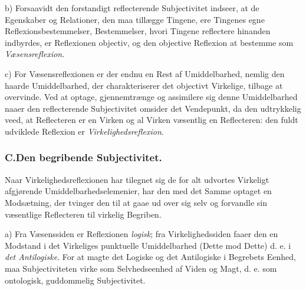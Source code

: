 \documentclass[11pt]{book}
\begin{document}
b) Forsaavidt den forstandigt reflecterende Subjectivitet indseer, at de
Egenskaber og Relationer, den maa tillægge Tingene, ere Tingenes egne
Reflexionsbestemmelser, Bestemmelser, hvori Tingene reflectere hinanden
indbyrdes, er Reflexionen objectiv, og den objective Reflexion at
bestemme som \emph{Væsensreflexion}.

c) For Væsensreflexionen er der endnu en Rest af Umiddelbarhed, nemlig
den haarde Umiddelbarhed, der charakteriserer det objectivt Virkelige,
tilbage at overvinde. Ved at optage, gjennemtrænge og assimilere sig
denne Umiddelbarhed naaer den reflecterende Subjectivitet omsider det
Vendepunkt, da den udtrykkelig veed, at Reflecteren er en Virken og al
Virken væsentlig en Reflecteren: den fuldt udviklede Reflexion er
\emph{Virkelighedsreflexion}.

\subsubsection*{C.\quad Den begribende Subjectivitet.}

Naar Virkelighedsreflexionen har tilegnet sig de for alt udvortes
Virkeligt afgjørende Umiddelbarhedselemenier, har den med det Samme
optaget en Modsætning, der tvinger den til at gaae ud over sig selv og
forvandle sin væsentlige Reflecteren til virkelig Begriben.

a) Fra Væsenssiden er Reflexionen \emph{logisk}; fra Virkelighedssiden
faaer den en Modstand i det Virkeliges punktuelle Umiddelbarhed (Dette
mod Dette) d. e. i \emph{det Antilogiske}. For at magte det Logiske og
det Antilogiske
i Begrebets Eenhed, maa Subjectiviteten virke som Selvhedseenhed af
Viden og Magt, d. e. som ontologisk, guddommelig Subjectivitet.
\end{document}
